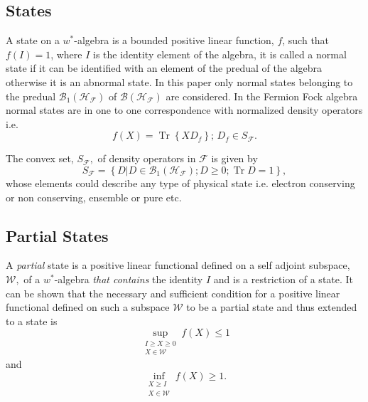 \documentclass[aps,preprint,amsfonts,amssymb,showpacs,showkeys]{revtex4}%
\begin{document}
\subsection{States \label{States}}

A state on a $w^{\ast}$-algebra is a bounded positive linear function, $f$,
such that $f\left(  I\right)  =1$, where $I$ is the identity element of the
algebra, it is called a normal state if it can be identified with an element
of the predual of the algebra otherwise it is an abnormal state. In this paper
only normal states belonging to the predual $\mathcal{B}_{1}\left(
\mathcal{H}_{\mathcal{F}}\right)  $ of $\mathcal{B}\left(  \mathcal{H}%
_{\mathcal{F}}\right)  $ are considered. In the Fermion Fock algebra normal
states are in one to one correspondence with normalized density operators
i.e.
\begin{equation}
f\left(  X\right)  =\operatorname*{Tr}\left\{  XD_{f}\right\}  ;\,D_{f}\in
S_{\mathcal{F}}.
\end{equation}


The convex set, $S_{\mathcal{F}},$ of density operators in $\mathcal{F}$ is
given by
\begin{equation}
S_{\mathcal{F}}=\left\{  D\left\vert D\in\mathcal{B}_{1}\left(  \mathcal{H}%
_{\mathcal{F}}\right)  ;D\geq0;\operatorname{Tr}D=1\right.  \right\}  ,
\end{equation}
whose elements could describe any type of physical state i.e. electron
conserving or non conserving, ensemble or pure etc.

\subsection{Partial States \label{Partial States}}

A \emph{partial} state is a positive linear functional defined on a self
adjoint subspace, $\mathcal{W},$ of a $w^{\ast}$-algebra \emph{that contains}
the identity $I$ and is a restriction of a state. It can be shown \cite{Emch,
Krein} that the necessary and sufficient condition for a positive linear
functional defined on such a subspace $\mathcal{W}$ to be a partial state and
thus extended to a state is
\begin{equation}
\sup_{\substack{I\geq X\geq0\\X\in\mathcal{W}}}f\left(  X\right)  \leq1
\label{LessI}%
\end{equation}
and%
\begin{equation}
\inf_{\substack{X\geq I\\X\in\mathcal{W}}}f\left(  X\right)  \geq1.
\label{MoreI}%
\end{equation}
\end{document}
